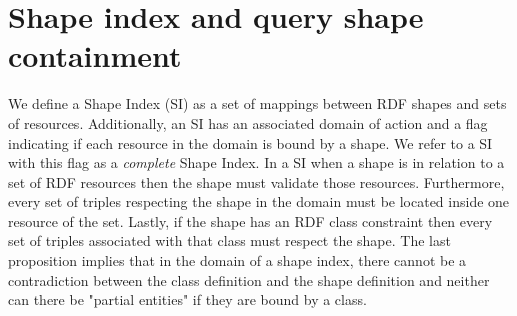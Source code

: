 \section{Shape index and query shape containment}


We define a Shape Index (SI) as a set of mappings between RDF shapes and sets of resources.
Additionally, an SI has an associated domain of action
and a flag indicating if each resource in the domain is bound by a shape. 
We refer to a SI with this flag as a \emph{complete} Shape Index.
In a SI when a shape is in relation to a set of RDF resources then the shape must validate those resources.
Furthermore, every set of triples respecting the shape in the domain must be located inside one resource of the set.
Lastly, if the shape has an RDF class constraint
then every set of triples associated with that class must respect the shape.
The last proposition implies that in the domain of a shape index, there cannot be a contradiction
between the class definition and the shape definition and neither can there be "partial entities" if they
are bound by a class.

